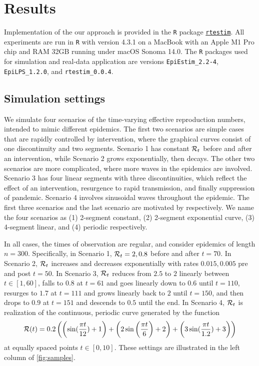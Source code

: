 \section{Results}

Implementation of the our approach is provided in the \texttt{R} package
\href{https://dajmcdon.github.io/rtestim/}{\texttt{rtestim}}. All experiments
are run in \texttt{R} with version 4.3.1 on a MacBook with an Apple M1 Pro 
chip and RAM 32GB running under macOS Sonoma 14.0. 
The \texttt{R} packages used for simulation and real-data application are
versions \texttt{EpiEstim\_2.2-4}, \texttt{EpiLPS\_1.2.0}, and
\texttt{rtestim\_0.0.4}. 

\subsection{Simulation settings}

We simulate four scenarios of the time-varying effective reproduction numbers,
intended to mimic different epidemics. The first two scenarios are simple cases
that are rapidly controlled by intervention, where the graphical curves consist
of one discontinuity and two segments. Scenario 1 has constant $\mathcal{R}_t$ before
and after an intervention, while Scenario 2 grows exponentially, then decays.
The other two scenarios are more complicated, where more waves in the epidemics
are involved. Scenario 3 has four linear segments with three discontinuities,
which reflect the effect of an intervention, resurgence to rapid transmission,
and finally suppression of pandemic. Scenario 4 involves sinusoidal waves
throughout the epidemic.
The first three scenarios and the last scenario are motivated by
\citep{parag2021improved, gressani2022epilps} respectively. 
We name the four scenarios as (1) 2-segment constant, (2) 2-segment exponential 
curve, (3) 4-segment linear, and (4) periodic respectively. 

In all cases, the times of observation are regular, and consider epidemics of
length $n=300$. Specifically, in Scenario 1, $\mathcal{R}_t = 2, 0.8$ before and after
$t=70$. In Scenario 2, $\mathcal{R}_t$ increases and decreases exponentially with
rates $0.015, 0.005$ pre and post $t=50$. In Scenario 3, $\mathcal{R}_t$ reduces from
$2.5$ to $2$ linearly between $t\in[1,60]$, falls to $0.8$ at $t=61$ and goes
linearly down to $0.6$ until $t=110$, resurges to $1.7$ at $t=111$ and grows
linearly back to $2$ until $t=150$, and then drops to $0.9$ at $t=151$ and
descends to $0.5$ until the end. In Scenario 4, $\mathcal{R}_t$ is realization of the
continuous, periodic curve generated by the function $$\mathcal{R}(t) = 0.2 \left(
\left(\sin(\frac{\pi t}{12}) + 1\right) + \left(2 \sin\left(\frac{\pi t}{6}\right) + 2\right) + \left(3
\sin(\frac{\pi t}{1.2}) + 3\right) \right)$$ at equally spaced points $t\in [0,10]$. These
settings are illustrated in the left column of \autoref{fig:samples}.


